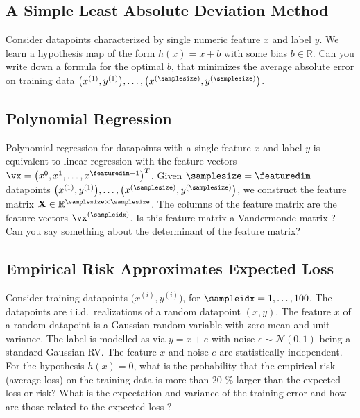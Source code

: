 \documentclass[12pt]{report}
\newcommand{\featurelen}{\featuredim}
\begin{document}
\subsection{A Simple Least Absolute Deviation Method}
\label{ex_chap_5_bias_absoluate_error}
Consider datapoints characterized by single numeric feature $x$ 
and label $y$. We learn a hypothesis map of the form $h(x) = x + b$ 
with some bias $b \in \mathbb{R}$. Can you write down a formula 
for the optimal $b$, that minimizes the average absolute error on 
training data $\big(x^{(1)},y^{(1)} \big),\ldots,\big(x^{(\samplesize)},y^{(\samplesize)}\big)$.   
		

\subsection{Polynomial Regression} 
\label{ex_chap_5_poly_reg} 
Polynomial regression for datapoints with a single feature $x$ and 
label $y$ is equivalent to linear regression with the feature 
vectors $\vx = \big(x^{0},x^{1},\ldots,x^{\featuredim-1}\big)^{T}$. 
Given $\samplesize = \featurelen$ datapoints $\big(x^{(1)},y^{(1)}\big),\ldots,\big(x^{(\samplesize)},y^{(\samplesize)}\big)$, 
we construct the feature matrix $\mathbf{X} \in \mathbb{R}^{\samplesize \times \samplesize}$. 
The columns of the feature matrix are the feature vectors $\vx^{(\sampleidx)}$. 
Is this feature matrix a Vandermonde matrix \cite{Gautschi1988}? Can you say 
something about the determinant of the feature matrix?

\subsection{Empirical Risk Approximates Expected Loss} 
\label{ex_chap_5_empriskapp} 
Consider training datapoints $\big(x^{(i)},y^{(i)} \big)$, for $\sampleidx = 1,\ldots,100$. 
The datapoints are i.i.d.\ realizations of a random datapoint $(x,y)$. 
The feature $x$ of a random datapoint is a Gaussian random variable 
with zero mean and unit variance. The label is modelled as 
via $y = x + e$ with noise $e \sim \mathcal{N}(0,1)$ being 
a standard Gaussian RV. The feature $x$ and noise $e$ 
are statistically independent. For the hypothesis $h(x)=0$, 
what is the probability that the empirical risk (average loss) on 
the training data is more than $20$ \% larger than the 
expected loss or risk? What is the expectation and variance 
of the training error and how are those related to the 
expected loss ? 
\end{document}
